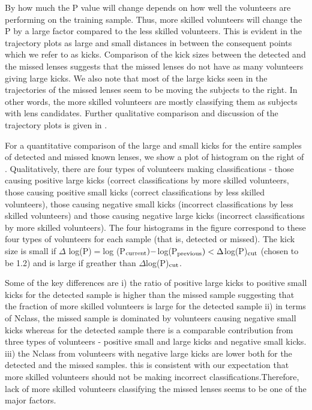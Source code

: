 \documentclass[useAMS,usenatbib,a4paper]{mn2e}
\begin{document}
By how much the P value will change depends on how well the
volunteers are performing on the training sample. Thus, more skilled
volunteers will change the P by a large factor compared to the less
skilled volunteers. This is evident in the trajectory plots as large and
small distances in between the consequent points which we refer to as
kicks. Comparison of the kick sizes between the detected
and the missed lenses suggests that the missed lenses do not have as
many volunteers giving large kicks. We also note that most of the large
kicks seen in the trajectories of the missed lenses seem to be moving
the subjects to the right. In other words, the more skilled volunteers
are mostly classifying them as subjects with lens candidates. Further
qualitative comparison and discussion of the trajectory plots is given
in .

For a quantitative comparison of the large and small kicks for the
entire samples of detected and missed known lenses, we show a plot of
histogram on the right of . Qualitatively, there are
four types of volunteers making classifications - those causing positive
large kicks (correct classifications by more skilled volunteers, those
causing positive small kicks (correct classifications by less skilled
volunteers), those causing negative small kicks (incorrect
classifications by less skilled volunteers) and those causing negative
large kicks (incorrect classifications by more skilled volunteers). The
four histograms in the figure correspond to these four types of
volunteers for each sample (that is, detected or missed). The kick size
is small if $\Delta$ log(P)$=$log (P$_{\rm current}) - $log(P$_{\rm
previous}) < \Delta$log(P)$_{\rm cut}$ (chosen to be 1.2) and is large
if greather than $\Delta$log(P)$_{\rm cut}$.

Some of the key differences are i) the ratio of positive large kicks to
positive small kicks for the detected sample is higher than the missed
sample suggesting that the fraction of more skilled volunteers is large
for the detected sample ii) in terms of Nclass, the missed sample is
dominated by volunteers causing negative small kicks whereas for the
detected sample there is a comparable contribution from three types of
volunteers - positive small and large kicks and negative small kicks.
iii) the Nclass from volunteers with negative large kicks are lower both
for the detected and the missed samples. this is consistent with our
expectation that more skilled volunteers should not be making incorrect
classifications.Therefore, lack of more skilled volunteers classifying
the missed lenses seems to be one of the major factors.
\end{document}
